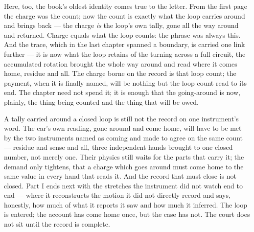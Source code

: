 Here, too, the book's oldest identity comes true to the letter. From the first page the charge was the count;
now the count is exactly what the loop carries around and brings back --- the charge \emph{is} the loop's own
tally, gone all the way around and returned. Charge equals what the loop counts: the phrase was always this.
And the trace, which in the last chapter spanned a boundary, is carried one link further --- it is now what the
loop retains of the turning across a full circuit, the accumulated rotation brought the whole way around and
read where it comes home, residue and all. The charge borne on the record is that loop count; the payment, when
it is finally named, will be nothing but the loop count read to its end. The chapter need not spend it; it is
enough that the going-around is now, plainly, the thing being counted and the thing that will be owed.

A tally carried around a closed loop is still not the record on one instrument's word. The car's own reading,
gone around and come home, will have to be met by the two instruments named as coming and made to agree on the
same count --- residue and sense and all, three independent hands brought to one closed number, not merely one.
Their physics still waits for the parts that carry it; the demand only tightens, that a charge which goes around
must come home to the same value in every hand that reads it. And the record that must close is not closed. Part
I ends next with the stretches the instrument did not watch end to end --- where it reconstructs the motion it
did not directly record and says, honestly, how much of what it reports it saw and how much it inferred. The
loop is entered; the account has come home once, but the case has not. The court does not sit until the record
is complete.

